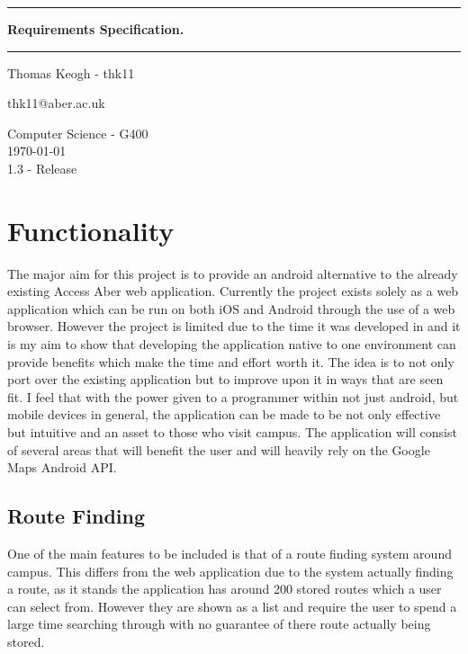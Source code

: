 
\begin{titlepage}
\center
\hrule
\vspace{0.3cm}

\huge
\textbf{  Requirements Specification.}
\vspace{0.3cm}
\hrule
\vspace{0.6cm}
\large


 Thomas Keogh - thk11
 \\
 \vspace{0.3cm}

 thk11@aber.ac.uk




\vspace{1cm}


\vspace{0.1cm}

Computer Science - G400
\\
\vspace{0.1cm}
\today \\
\vspace{0.1cm}
1.3 - Release


\end{titlepage}

\section{Functionality}

The major aim for this project is to provide an android alternative to the already existing Access Aber web application. Currently the project exists solely as a web application which can be run on both iOS and Android through the use of a web browser. However the project is limited due to the time it was developed in and it is my aim to show that developing the application native to one environment can provide benefits which make the time and effort worth it. The idea is to not only port over the existing application but to improve upon it in ways that are seen fit. I feel that with the power given to a programmer within not just android, but mobile devices in general, the application can be made to be not only effective but intuitive and an asset to those who visit campus. The application will consist of several areas that will benefit the user and will heavily rely on the Google Maps Android API. 
\subsection{Route Finding}
One of the main features to be included is that of a route finding system around campus. This differs from the web application due to the system actually finding a route, as it stands the application has around 200 stored routes which a user can select from. However they are shown as a list and require the user to spend a large time searching through with no guarantee of there route actually being stored.

